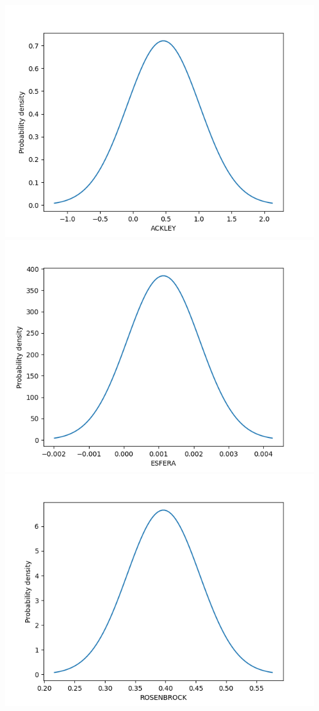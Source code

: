 \documentclass{article}
\begin{document}
\includegraphics[scale=0.5]{EP/ackley.png}
\includegraphics[scale=0.5]{EP/esfera.png}
\includegraphics[scale=0.5]{EP/rosenbrock.png}
\end{document}
